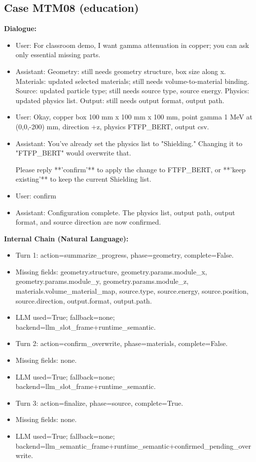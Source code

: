 \documentclass[11pt]{ctexart}
\begin{document}
\subsection{Case MTM08 (education)}
\textbf{Dialogue:}
\begin{itemize}
\item User: For classroom demo, I want gamma attenuation in copper; you can ask only essential missing parts.
\item Assistant: Geometry: still needs geometry structure, box size along x. Materials: updated selected materials; still needs volume-to-material binding. Source: updated particle type; still needs source type, source energy. Physics: updated physics list. Output: still needs output format, output path.
\item User: Okay, copper box 100 mm x 100 mm x 100 mm, point gamma 1 MeV at (0,0,-200) mm, direction +z, physics FTFP\_BERT, output csv.
\item Assistant: You've already set the physics list to "Shielding." Changing it to "FTFP\_BERT" would overwrite that.

Please reply **'confirm'** to apply the change to FTFP\_BERT, or **'keep existing'** to keep the current Shielding list.
\item User: confirm
\item Assistant: Configuration complete. The physics list, output path, output format, and source direction are now confirmed.
\end{itemize}
\textbf{Internal Chain (Natural Language):}
\begin{itemize}
\item Turn 1: action=summarize\_progress, phase=geometry, complete=False.
\item Missing fields: geometry.structure, geometry.params.module\_x, geometry.params.module\_y, geometry.params.module\_z, materials.volume\_material\_map, source.type, source.energy, source.position, source.direction, output.format, output.path.
\item LLM used=True; fallback=none; backend=llm\_slot\_frame+runtime\_semantic.
\item Turn 2: action=confirm\_overwrite, phase=materials, complete=False.
\item Missing fields: none.
\item LLM used=True; fallback=none; backend=llm\_slot\_frame+runtime\_semantic.
\item Turn 3: action=finalize, phase=source, complete=True.
\item Missing fields: none.
\item LLM used=True; fallback=none; backend=llm\_semantic\_frame+runtime\_semantic+confirmed\_pending\_overwrite.
\end{itemize}
\end{document}
